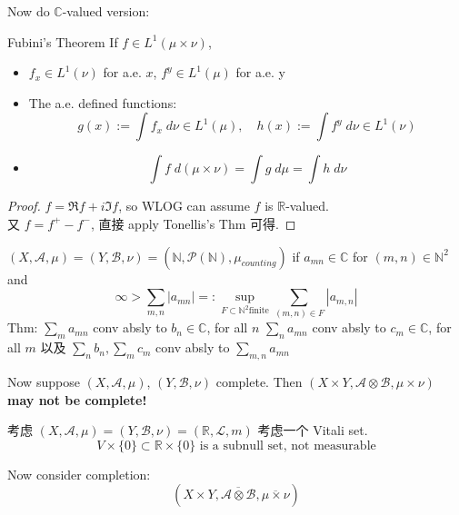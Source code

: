\documentclass[lang=cn,11pt]{elegantbook}
\begin{document}
Now do $\mathbb{C}$-valued version:





\begin{theorem}{Fubini's Theorem}
    If $f \in L^1(\mu \times \nu)$, 
    \begin{itemize}
        \item $f_x \in L^1(\nu)$ for a.e. $x$, $f^y \in L^1(\mu)$ for a.e. y
        \item The a.e. defined functions: \[ g(x) := \int f_x \;d\nu \in L^1(\mu),\quad h(x) := \int f^y \;d\nu \in L^1(\nu) \]
        \item \[ \int f \; d(\mu \times \nu)  = \int g \; d\mu = \int h \; d\nu \]
    \end{itemize}
\end{theorem}
\begin{proof}
\(f = \Re f + i \Im f \), so WLOG can assume $f$ is $\mathbb{R}$-valued.\\
又 $f = f^+ - f^-$, 直接 apply Tonellis's Thm 可得.
\end{proof}



\begin{example}
    $(X, \mathcal{A}, \mu) = (Y , \mathcal{B}, \nu) = (\mathbb{N}, \mathcal{P}(\mathbb{N}), \mu_{counting})$
if $a_{mn} \in \mathbb{C}$ for $(m,n) \in \mathbb{N}^2$ and \[
\infty > \sum_{m,n} |a_{mn}| =: \sup_{F \subset \mathbb{N}^2  \text{finite}} \sum_{(m,n) \in F}  |a_{m,n}|
\]
Thm: $\sum_m a_{mn}$ conv absly to $b_n \in \mathbb{C}$, for all $n$
$\sum_n a_{mn}$ conv absly to $c_m \in \mathbb{C}$, for all $m$
以及 $\sum_n b_n, \sum_m c_m$ conv absly to $\sum_{m,n} a_{mn}$
\end{example}



Now suppose \((X, \mathcal{A}, \mu)\), $ (Y , \mathcal{B}, \nu)$ complete. Then \((X\times Y , \mathcal{A} \otimes \mathcal{B} , \mu\times \nu  )\) \textbf{may not be complete!}

\begin{example}
      考虑 $(X, \mathcal{A}, \mu) = (Y , \mathcal{B}, \nu) = (\mathbb{R}, \mathcal{L}, m)$
       考虑一个 Vitali set. \[
       V \times \{0\} \subset \mathbb{R} \times \{0\} \text{ is a subnull set, not measurable}
       \]
\end{example}



Now consider completion: \[
(X \times Y , \overline{\mathcal{A} \otimes \mathcal{B}},  \overline{\mu \times \nu}   ) 
\]
\end{document}
